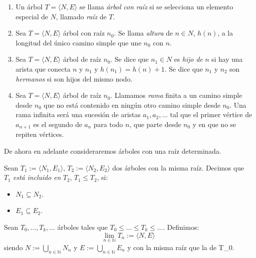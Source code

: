 \begin{defs}\mbox{}
\begin{enumerate}
    \item Un árbol $T = \langle N, E \rangle$ se llama \textit{árbol con raíz} si se selecciona un elemento especial de $N$, llamado \textit{raíz} de $T$.
    \item Sea $T = \langle N, E \rangle$ árbol con raíz $n_0$. Se llama \textit{altura} de $n \in N$, $h(n)$, a la longitud del único camino simple que une $n_0$ con $n$.
    \item Sea $T = \langle N, E \rangle$ árbol de raíz $n_0$. Se dice que $n_1\in N$ es \textit{hijo de} $n$ si hay una arista que conecta $n$ y $n_1$ y $h(n_1)=h(n)+1$. Se dice que $n_1$ y $n_2$ son \textit{hermanos} si son hijos del mismo nodo.
    \item Sea $T = \langle N, E \rangle$ árbol de raíz $n_0$. Llamamos \textit{rama} finita a un camino simple desde $n_0$ que no está contenido en ningún otro camino simple desde $n_0$. Una rama infinita será una sucesión de aristas $a_1,a_2,\dots$ tal que el primer vértice de $a_{n+1}$ es el segundo de $a_n$ para todo $n$, que parte desde $n_0$ y en que no se repiten vértices.
\end{enumerate}
\end{defs}

De ahora en adelante consideraremos árboles con una raíz determinada.

\begin{definition}
Sean $T_1 := \langle N_1, E_1 \rangle$, $T_2 :=  \langle N_2, E_2 \rangle$ dos árboles con la misma raíz. Decimos que $T_1$ \textit{está incluido en} $T_2$, $T_1 \leq T_2$, si:
\begin{itemize}
    \item $N_1 \subseteq N_2$.
    \item $E_1 \subseteq E_2$.
\end{itemize}
\end{definition}

\begin{definition}
Sean $T_0, \dots, T_k, \dots$ árboles tales que $T_0 \leq \dots \leq T_k \leq \dots$. Definimos:
$$\lim_{n \in \mathbb{N}} T_n := \langle N, E \rangle$$
siendo $N := \bigcup_{n\in \mathbb{N}} N_{n}$ y $E := \bigcup_{n\in \mathbb{N}} E_{n}$ y con la misma raíz que la de T_0.
\end{definition}

